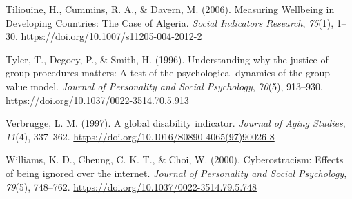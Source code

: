 \documentclass[
  letterpaper,
  DIV=11,
  numbers=noendperiod]{scrartcl}
\newlength{\cslhangindent}
\newlength{\cslentryspacingunit} %
\newenvironment{CSLReferences}[2] %
 {%
  \setlength{\parindent}{0pt}
  \ifodd #1
  \let\oldpar\par
  \def\par{\hangindent=\cslhangindent\oldpar}
  \fi
  \setlength{\parskip}{#2\cslentryspacingunit}
 }%
 {}
\begin{document}
\begin{CSLReferences}{1}{0}
\leavevmode{}%
Tiliouine, H., Cummins, R. A., \& Davern, M. (2006). Measuring Wellbeing
in Developing Countries: The Case of Algeria. \emph{Social Indicators
Research}, \emph{75}(1), 1--30.
\url{https://doi.org/10.1007/s11205-004-2012-2}

\leavevmode{}%
Tyler, T., Degoey, P., \& Smith, H. (1996). Understanding why the
justice of group procedures matters: A test of the psychological
dynamics of the group-value model. \emph{Journal of Personality and
Social Psychology}, \emph{70}(5), 913--930.
\url{https://doi.org/10.1037/0022-3514.70.5.913}

\leavevmode{}%
Verbrugge, L. M. (1997). A global disability indicator. \emph{Journal of
Aging Studies}, \emph{11}(4), 337--362.
\url{https://doi.org/10.1016/S0890-4065(97)90026-8}

\leavevmode{}%
Williams, K. D., Cheung, C. K. T., \& Choi, W. (2000). Cyberostracism:
Effects of being ignored over the internet. \emph{Journal of Personality
and Social Psychology}, \emph{79}(5), 748--762.
\url{https://doi.org/10.1037/0022-3514.79.5.748}

\end{CSLReferences}
\end{document}
